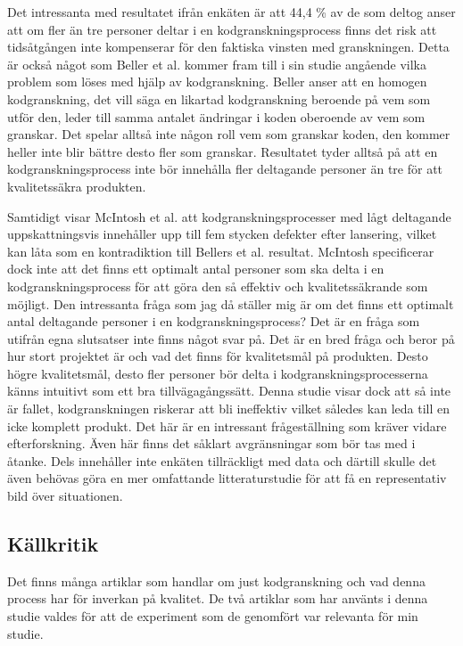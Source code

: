 Det intressanta med resultatet ifrån enkäten är att 44,4 \% av de som deltog anser att om fler än tre personer deltar i en kodgranskningsprocess finns det risk att tidsåtgången inte kompenserar för den faktiska vinsten med granskningen. Detta är också något som Beller et al. \cite{beller2014modern} kommer fram till i sin studie angående vilka problem som löses med hjälp av kodgranskning. Beller anser att en homogen kodgranskning, det vill säga en likartad kodgranskning beroende på vem som utför den, leder till samma antalet ändringar i koden oberoende av vem som granskar. Det spelar alltså inte någon roll vem som granskar koden, den kommer heller inte blir bättre desto fler som granskar. Resultatet tyder alltså på att en kodgranskningsprocess inte bör innehålla fler deltagande personer än tre för att kvalitetssäkra produkten. 

Samtidigt visar McIntosh et al. \cite{mcintosh2014impact} att kodgranskningsprocesser med lågt deltagande uppskattningsvis innehåller upp till fem stycken defekter efter lansering, vilket kan låta som en kontradiktion till Bellers et al. \cite{beller2014modern} resultat. McIntosh specificerar dock inte att det finns ett optimalt antal personer som ska delta i en kodgranskningsprocess för att göra den så effektiv och kvalitetssäkrande som möjligt. Den intressanta fråga som jag då ställer mig är om det finns ett optimalt antal deltagande personer i en kodgranskningsprocess? Det är en fråga som utifrån egna slutsatser inte finns något svar på. Det är en bred fråga och beror på hur stort projektet är och vad det finns för kvalitetsmål på produkten. Desto högre kvalitetsmål, desto fler personer bör delta i kodgranskningsprocesserna känns intuitivt som ett bra tillvägagångssätt. Denna studie visar dock att så inte är fallet, kodgranskningen riskerar att bli ineffektiv vilket således kan leda till en icke komplett produkt. Det här är en intressant frågeställning som kräver vidare efterforskning. Även här finns det såklart avgränsningar som bör tas med i åtanke. Dels innehåller inte enkäten tillräckligt med data och därtill skulle det även behövas göra en mer omfattande litteraturstudie för att få en representativ bild över situationen.

\subsection{Källkritik}
Det finns många artiklar som handlar om just kodgranskning och vad denna process har för inverkan på kvalitet. De två artiklar som har använts i denna studie valdes för att de experiment som de genomfört var relevanta för min studie. 

